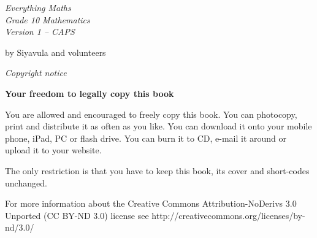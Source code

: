 

\begin{titlepage}
\begin{adjustwidth}{1in}{1in}
\begin{center}
    \thispagestyle{empty}

    \vspace*{4in}

    {\normalfont\sffamily\fontsize{36}\normalfont\itshape{Everything Maths } \\ \vspace*{1cm}
    {\normalfont\sffamily\fontsize{22}\normalfont\itshape{Grade 10 Mathematics}}
    \vspace*{1in} \\
    \LARGE Version 1 -- CAPS \\

   {\vspace*{2in}
     by Siyavula and volunteers 
  

\vfill

    }}
\end{center}
\end{adjustwidth}
\end{titlepage}






\newpage
\thispagestyle{empty}
{
\begin{center}
\normalfont\sffamily\fontsize{22}\normalfont\itshape Copyright notice\\

\vspace*{1in}

\textbf{Your freedom to legally copy this book}\\

\end{center}
}

{\large
You are allowed and encouraged to freely copy this book. You can photocopy, print and distribute it as
often as you like. You can download it onto your mobile phone, iPad, PC or flash drive. You can burn it
to CD, e-mail it around or upload it to your website. \par

The only restriction is that you have to keep this book, its cover and short-codes unchanged.\par

For more information about the Creative Commons Attribution-NoDerivs 3.0 Unported (CC BY-ND
3.0) license see http://creativecommons.org/licenses/by-nd/3.0/}\\

